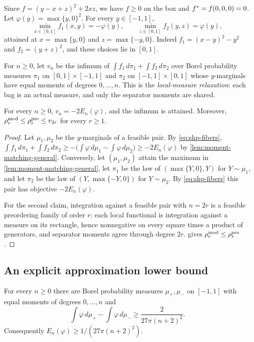 Since $f=(y-x+z)^2+2xz$, we have $f\ge0$ on the box and $f^{*}=f(0,0,0)=0$.
Let $\varphi(y)=\max\{y,0\}^2$. For every $y\in[-1,1]$,
\begin{equation}\label{eq:shp-fibers}
  \min_{x\in[0,1]}f_1(x,y)=-\varphi(y),\qquad
  \min_{z\in[0,1]}f_2(y,z)=\varphi(y),
\end{equation}
attained at $x=\max\{y,0\}$ and $z=\max\{-y,0\}$. Indeed
$f_1=(x-y)^2-y^2$ and $f_2=(y+z)^2$, and these choices lie in $[0,1]$.

For $n\ge0$, let $v_n$ be the infimum of $\int f_1\,d\pi_1+\int f_2\,d\pi_2$
over Borel probability measures $\pi_1$ on $[0,1]\times[-1,1]$ and $\pi_2$
on $[-1,1]\times[0,1]$ whose $y$-marginals have equal moments of degrees
$0,\dots,n$. This is the \emph{local-measure relaxation}: each bag is an
actual measure, and only the separator moments are shared.

\begin{proposition}\label{prop:moment-matching}
For every $n\ge0$, $v_n=-2E_n(\varphi)$, and the infimum is attained.
Moreover, $\rho^{\mathrm{mod}}_r\le\rho^{\mathrm{pre}}_r\le v_{2r}$ for every $r\ge1$.
\end{proposition}

\begin{proof}
Let $\mu_1,\mu_2$ be the $y$-marginals of a feasible pair. By
\eqref{eq:shp-fibers}, $\int f_1\,d\pi_1+\int f_2\,d\pi_2\ge
-\bigl(\int\varphi\,d\mu_1-\int\varphi\,d\mu_2\bigr)\ge-2E_n(\varphi)$ by
\cref{lem:moment-matching-general}. Conversely, let $(\mu_1,\mu_2)$ attain
the maximum in \cref{lem:moment-matching-general}, let $\pi_1$ be the law
of $(\max\{Y,0\},Y)$ for $Y\sim\mu_1$, and let $\pi_2$ be the law of
$(Y,\max\{-Y,0\})$ for $Y\sim\mu_2$. By \eqref{eq:shp-fibers} this pair has
objective $-2E_n(\varphi)$.

For the second claim, integration against a feasible pair with $n=2r$ is a
feasible preordering family of order $r$: each local functional is
integration against a measure on its rectangle, hence nonnegative on every
square times a product of generators, and separator moments agree through
degree $2r$.  gives $\rho^{\mathrm{mod}}_r\le\rho^{\mathrm{pre}}_r$.
\end{proof}

\subsection{An explicit approximation lower bound}\label{sec:shp-fejer}

\begin{lemma}\label{lem:fejer-lower}
For every $n\ge0$ there are Borel probability measures $\mu_+,\mu_-$ on
$[-1,1]$ with equal moments of degrees $0,\dots,n$ and
\begin{equation}\label{eq:shp-fejer}
  \int\varphi\,d\mu_+-\int\varphi\,d\mu_-\ge\frac2{27\pi(n+2)^2}.
\end{equation}
Consequently $E_n(\varphi)\ge1/(27\pi(n+2)^2)$.
\end{lemma}

